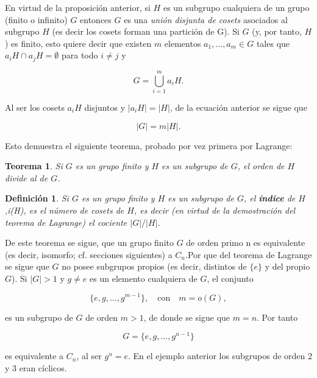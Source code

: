 \documentclass{report}
\newtheorem{theorem}{Teorema}
\newtheorem{definition}{Definición}
\begin{document}
En virtud de la proposición anterior, si \( H \) es un subgrupo cualquiera de un grupo (finito o infinito) \( G \) entonces \( G \) es una \textit{unión disjunta de cosets} asociados al subgrupo \( H \) (es decir los cosets forman una partición de G). Si \( G \) (y, por tanto, \( H \)) es finito, esto quiere decir que existen \( m \) elementos \( a_1, \dots, a_m \in G \) tales que \( a_i H \cap a_j H = \emptyset \) para todo \( i \neq j \) y

\[
G = \bigcup_{i=1}^{m} a_i H.
\]

Al ser los cosets \( a_i H \) disjuntos y \( |a_i H| = |H| \), de la ecuación anterior se sigue que

\[
|G| = m |H|.
\]

Esto demuestra el siguiente teorema, probado por vez primera por Lagrange:

\begin{theorem}
Si \( G \) es un grupo finito y \( H \) es un subgrupo de \( G \), el orden de \( H \) divide al de \( G \).
\end{theorem}













\begin{definition}
Si \( G \) es un grupo finito y \( H \) es un subgrupo de \( G \), el \textbf{índice} de \( H \),i(H), es el número de cosets de \( H \), es decir (en virtud de la demostración del teorema de Lagrange) el cociente \( |G| / |H| \).
\label{8}
\end{definition}



De este teorema se sigue, que un grupo finito \( G \) de orden primo  n  es equivalente (es decir, isomorfo; cf. secciones siguientes) a \( C_n \).Por que del teorema de Lagrange se sigue que \( G \) no posee subgrupos propios (es decir, distintos de \( \{e\} \) y del propio \( G \)).  Si \( |G| > 1 \) y \( g \neq e \) es un elemento cualquiera de \( G \), el conjunto

\[
\{ e, g, \dots, g^{m-1} \}, \quad \text{con} \quad m = o(G),
\]

es un subgrupo de \( G \) de orden \( m > 1 \), de donde se sigue que \( m = n \). Por tanto

\[
G = \{ e, g, \dots, g^{n-1} \}
\]

es equivalente a \( C_n \), al ser \( g^n = e \). En el ejemplo anterior los subgrupos de orden 2 y 3 eran cíclicos.
\end{document}
